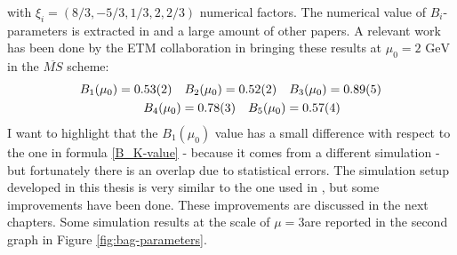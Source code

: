 \documentclass[english, LaM, oneside, noexaminfo]{sapthesis}
\newcommand{\gev}{\text{ GeV}}
\begin{document}
with $\xi_i = \left(8/3, -5/3, 1/3, 2, 2/3\right)$ numerical factors.
The numerical value of $B_i$-parameters is extracted in \cite{Bparameters} and a large amount of other papers.
A relevant work has been done by the ETM collaboration in \cite{KMBSM} bringing these results at $\mu_0 = 2\gev$ in the $\overline{MS}$ scheme:
\begin{equation}\label{eq:b_i-in-kmbsm}
    \begin{aligned}
        & B_1(\mu_0) = 0.53(2) \quad B_2(\mu_0) = 0.52(2) \quad B_3(\mu_0) = 0.89(5) \\
        & \hspace*{18mm} B_4(\mu_0) = 0.78(3) \quad B_5(\mu_0) = 0.57(4)
    \end{aligned}
\end{equation}
I want to highlight that the $B_1(\mu_0)$ value has a small difference with respect to the one in formula \ref{B_K-value} - because it comes from a different simulation - but fortunately there is an overlap due to statistical errors.
The simulation setup developed in this thesis is very similar to the one used in \cite{KMBSM}, but some improvements have been done.
These improvements are discussed in the next chapters.
Some simulation results at the scale of $\mu=3$\gev\space are reported in the second graph in Figure \ref{fig:bag-parameters}.
\end{document}

